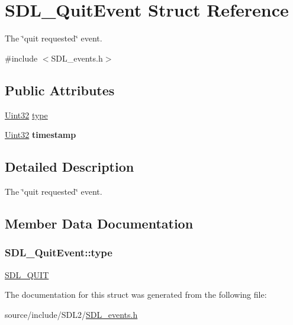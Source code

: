 \hypertarget{struct_s_d_l___quit_event}{}\section{S\+D\+L\+\_\+\+Quit\+Event Struct Reference}
\label{struct_s_d_l___quit_event}


The \char`\"{}quit requested\char`\"{} event.  




{\ttfamily \#include $<$S\+D\+L\+\_\+events.\+h$>$}

\subsection*{Public Attributes}
\begin{DoxyCompactItemize}
\item 
\hyperlink{_s_d_l__stdinc_8h_add440eff171ea5f55cb00c4a9ab8672d}{Uint32} \hyperlink{struct_s_d_l___quit_event_a51ab0279e6de40249ba93971a8757cf0}{type}
\item 
\hypertarget{struct_s_d_l___quit_event_a7acd4fa42ca96da8edac146baaa0b433}{}\hyperlink{_s_d_l__stdinc_8h_add440eff171ea5f55cb00c4a9ab8672d}{Uint32} {\bfseries timestamp}\label{struct_s_d_l___quit_event_a7acd4fa42ca96da8edac146baaa0b433}

\end{DoxyCompactItemize}


\subsection{Detailed Description}
The \char`\"{}quit requested\char`\"{} event. 

\subsection{Member Data Documentation}
\hypertarget{struct_s_d_l___quit_event_a51ab0279e6de40249ba93971a8757cf0}{}
\subsubsection[{type}]{ S\+D\+L\+\_\+\+Quit\+Event\+::type}\label{struct_s_d_l___quit_event_a51ab0279e6de40249ba93971a8757cf0}
\hyperlink{_s_d_l__events_8h_a3b589e89be6b35c02e0dd34a55f3fccaa31acc5fdafc86ebe2c1f5c3cae48d603}{S\+D\+L\+\_\+\+Q\+U\+I\+T} 

The documentation for this struct was generated from the following file\+:\begin{DoxyCompactItemize}
\item 
source/include/\+S\+D\+L2/\hyperlink{_s_d_l__events_8h}{S\+D\+L\+\_\+events.\+h}\end{DoxyCompactItemize}
